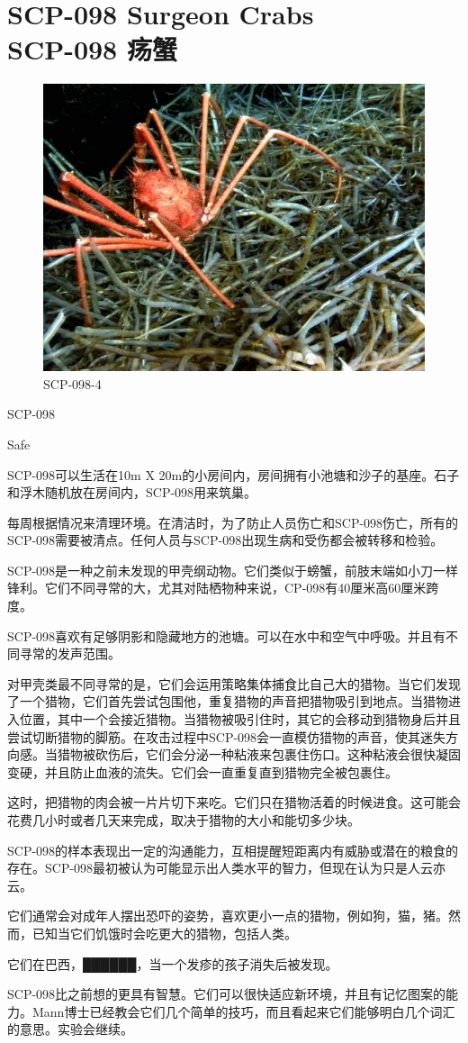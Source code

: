 \chapter[SCP-098 疡蟹]{
    SCP-098 Surgeon Crabs\\
    SCP-098 疡蟹
}

\label{chap:SCP-098}

\begin{figure}[H]
    \centering
    \includegraphics[width=0.5\linewidth]{images/SCP.098.jpg}
    \caption*{SCP-098-4}
\end{figure}

SCP-098

Safe

SCP-098可以生活在10m X 20m的小房间内，房间拥有小池塘和沙子的基座。石子和浮木随机放在房间内，SCP-098用来筑巢。

每周根据情况来清理环境。在清洁时，为了防止人员伤亡和SCP-098伤亡，所有的SCP-098需要被清点。任何人员与SCP-098出现生病和受伤都会被转移和检验。

SCP-098是一种之前未发现的甲壳纲动物。它们类似于螃蟹，前肢末端如小刀一样锋利。它们不同寻常的大，尤其对陆栖物种来说，CP-098有40厘米高60厘米跨度。

SCP-098喜欢有足够阴影和隐藏地方的池塘。可以在水中和空气中呼吸。并且有不同寻常的发声范围。

对甲壳类最不同寻常的是，它们会运用策略集体捕食比自己大的猎物。当它们发现了一个猎物，它们首先尝试包围他，重复猎物的声音把猎物吸引到地点。当猎物进入位置，其中一个会接近猎物。当猎物被吸引住时，其它的会移动到猎物身后并且尝试切断猎物的脚筋。在攻击过程中SCP-098会一直模仿猎物的声音，使其迷失方向感。当猎物被砍伤后，它们会分泌一种粘液来包裹住伤口。这种粘液会很快凝固变硬，并且防止血液的流失。它们会一直重复直到猎物完全被包裹住。

这时，把猎物的肉会被一片片切下来吃。它们只在猎物活着的时候进食。这可能会花费几小时或者几天来完成，取决于猎物的大小和能切多少块。

SCP-098的样本表现出一定的沟通能力，互相提醒短距离内有威胁或潜在的粮食的存在。SCP-098最初被认为可能显示出人类水平的智力，但现在认为只是人云亦云。

它们通常会对成年人摆出恐吓的姿势，喜欢更小一点的猎物，例如狗，猫，猪。然而，已知当它们饥饿时会吃更大的猎物，包括人类。

它们在巴西，██████，当一个发疹的孩子消失后被发现。

SCP-098比之前想的更具有智慧。它们可以很快适应新环境，并且有记忆图案的能力。Mann博士已经教会它们几个简单的技巧，而且看起来它们能够明白几个词汇的意思。实验会继续。
